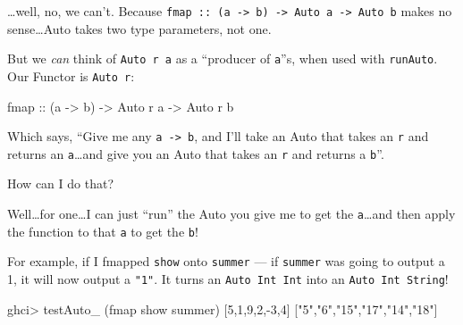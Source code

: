 \documentclass[]{article}
\newenvironment{Shaded}{}{}
\newcommand{\KeywordTok}[1]{\textcolor[rgb]{0.00,0.44,0.13}{\textbf{{#1}}}}
\newcommand{\DataTypeTok}[1]{\textcolor[rgb]{0.56,0.13,0.00}{{#1}}}
\newcommand{\DecValTok}[1]{\textcolor[rgb]{0.25,0.63,0.44}{{#1}}}
\newcommand{\StringTok}[1]{\textcolor[rgb]{0.25,0.44,0.63}{{#1}}}
\newcommand{\CommentTok}[1]{\textcolor[rgb]{0.38,0.63,0.69}{\textit{{#1}}}}
\newcommand{\OtherTok}[1]{\textcolor[rgb]{0.00,0.44,0.13}{{#1}}}
\newcommand{\FunctionTok}[1]{\textcolor[rgb]{0.02,0.16,0.49}{{#1}}}
\newcommand{\NormalTok}[1]{{#1}}
\begin{document}
\ldots{}well, no, we can't. Because
\texttt{fmap\ ::\ (a\ -\textgreater{}\ b)\ -\textgreater{}\ Auto\ a\ -\textgreater{}\ Auto\ b}
makes no sense\ldots{}Auto takes two type parameters, not one.

But we \emph{can} think of \texttt{Auto\ r\ a} as a ``producer of
\texttt{a}''s, when used with \texttt{runAuto}. Our Functor is
\texttt{Auto\ r}:

\begin{Shaded}
\begin{Highlighting}[]
\NormalTok{fmap}\OtherTok{ ::} \NormalTok{(a }\OtherTok{->} \NormalTok{b) }\OtherTok{->} \DataTypeTok{Auto} \NormalTok{r a }\OtherTok{->} \DataTypeTok{Auto} \NormalTok{r b}
\end{Highlighting}
\end{Shaded}

Which says, ``Give me any \texttt{a\ -\textgreater{}\ b}, and I'll take
an Auto that takes an \texttt{r} and returns an \texttt{a}\ldots{}and
give you an Auto that takes an \texttt{r} and returns a \texttt{b}''.

How can I do that?

Well\ldots{}for one\ldots{}I can just ``run'' the Auto you give me to
get the \texttt{a}\ldots{}and then apply the function to that \texttt{a}
to get the \texttt{b}!

For example, if I fmapped \texttt{show} onto \texttt{summer} --- if
\texttt{summer} was going to output a 1, it will now output a
\texttt{"1"}. It turns an \texttt{Auto\ Int\ Int} into an
\texttt{Auto\ Int\ String}!

\begin{Shaded}
\end{Shaded}

\begin{Shaded}
\begin{Highlighting}[]
\NormalTok{ghci}\FunctionTok{>} \NormalTok{testAuto_ (fmap show summer) [}\DecValTok{5}\NormalTok{,}\DecValTok{1}\NormalTok{,}\DecValTok{9}\NormalTok{,}\DecValTok{2}\NormalTok{,}\FunctionTok{-}\DecValTok{3}\NormalTok{,}\DecValTok{4}\NormalTok{]}
\NormalTok{[}\StringTok{"5"}\NormalTok{,}\StringTok{"6"}\NormalTok{,}\StringTok{"15"}\NormalTok{,}\StringTok{"17"}\NormalTok{,}\StringTok{"14"}\NormalTok{,}\StringTok{"18"}\NormalTok{]}
\end{Highlighting}
\end{Shaded}
\end{document}
